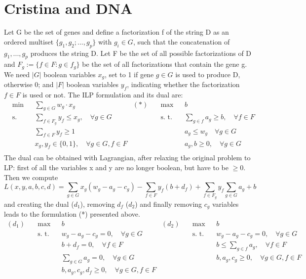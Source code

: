 \section{Cristina and DNA}
Let G be the set of genes and define a factorization f of the string D as an ordered multiset $\{g_1, g_2; ..., g_p\}$ with $g_i \in G$, such that the concatenation of $g_1, ..., g_p$ produces the string D. Let F be the set of all possible factorizations of D and $F_g:= \{f \in F : g \in f_g\}$ be the set of all factorizations that contain the gene g. We need $|G|$ boolean variables $x_g$, set to 1 if gene $g \in G$ is used to produce D, otherwise 0; and $|F|$ boolean variables $y_f$, indicating whether the factorization $f \in F$ is used or not. The ILP formulation and its dual are:
\begin{align*}
&\text{min} && \sum_{g \in G} w_g \cdot x_g & (*) \quad & \text{max}&& b  \\
&\text{s. t.} && \sum_{f \in F_g} y_f \leq x_g, \quad \forall g \in G &&\text{s. t.} && \sum_{g \in f} a_g \geq b, \quad \forall f \in F \\
&&& \sum_{f \in F} y_f \geq 1 &&&&  a_g \leq w_g \quad \forall g \in G\\
&&& x_g,y_f \in \{0,1\}, \quad \forall g \in G, f \in F &&&& a_g,b \geq 0, \quad \forall g \in G\\
\end{align*}
The dual can be obtained with Lagrangian, after relaxing the original problem to LP: first of all the variables x and y are no longer boolean, but have to be $\geq 0$. Then we compute
\[
L(x,y,a,b,c,d) = \sum_{g \in G} x_g (w_g - a_g - c_g) - \sum_{f \in F} y_f (b + d_f) + \sum_{f \in F_g} y_f\sum_{g \in G} a_g + b
\]
and creating the dual ($d_1$), removing $d_f$ ($d_2$) and finally removing $c_g$ variables leads to the formulation (*) presented above.
\begin{align*}
(d_1) \quad&\text{max} && b & (d_2)\quad& \text{max}&& b  \\
&\text{s. t.} && w_g -a_g-c_g = 0, \quad \forall g \in G &&\text{s. t.} && w_g - a_g -c_g = 0, \quad \forall g \in G \\
&&& b +d_f = 0, \quad \forall f \in F &&&&  b \leq \sum_{g \in f} a_g, \quad \forall f \in F\\
&&&\sum_{g \in G} a_g = 0, \quad \forall g \in G &&&& b,a_g,c_g \geq 0, \quad \forall g \in G, f \in F\\
&&& b,a_g,c_g,d_f \geq 0, \quad \forall g \in G, f \in F  &&&&\\
\end{align*}


